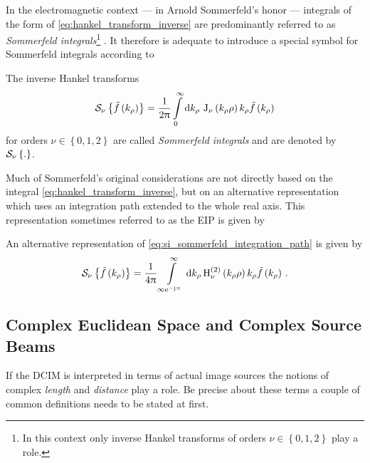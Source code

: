 In the electromagnetic context --- in Arnold Sommerfeld's honor --- integrals of
the form of \eqref{eq:hankel_transform_inverse} are predominantly referred to
as \emph{Sommerfeld integrals}\footnote{In this context only inverse Hankel
transforms of orders $\nu \in \left\{0, 1, 2\right\}$ play a role.}
\cite{Sommerfeld1909, Mosig2021}.
It therefore is adequate to introduce a special symbol for Sommerfeld integrals
according to
\begin{definition}	
	The inverse Hankel transforms
	\begin{equation}\label{eq:si_sommerfeld_integration_path}
		\mathcal{S}_{\nu} \left\{\tilde{f} \left( k_\rho \right)\right\} =
		\frac{1}{2\uppi}
		\int\limits_{0}^{\infty} \mathrm{d} k_\rho \,
		\operatorname{J}_{\nu}\left(k_\rho \rho\right) k_\rho
		\tilde{f} \left(k_\rho\right) 
	\end{equation}
	for orders $\nu \in \left\{0, 1, 2\right\}$ are called \emph{Sommerfeld
	integrals} and are denoted by $\mathcal{S}_{\nu} \left\{.\right\}$.
\end{definition}

Much of Sommerfeld's original considerations \cite{Sommerfeld1909} are not
directly based on the integral \eqref{eq:hankel_transform_inverse}, but
on an alternative representation which uses an integration path extended to
the whole real axis. This representation sometimes referred to as the \ac{EIP}
is given by
\begin{corollary}
	An alternative representation of \eqref{eq:si_sommerfeld_integration_path}
	is given by
	\begin{equation}\label{eq:si_extended_integration_path}
		\mathcal{S}_{\nu} \left\{\tilde{f} \left( k_\rho \right)\right\} =
		\frac{1}{4\uppi}
		\int\limits_{\infty \mathrm{e}^{-\mathrm{j} \uppi}\,}^{\infty} \mathrm{d} k_\rho 
		\operatorname{H}_{\nu}^{\left( 2 \right)} \left(k_\rho \rho\right) k_\rho 
		\tilde{f} \left(k_\rho\right) \, .
	\end{equation}
\end{corollary}





\subsection{Complex Euclidean Space and Complex Source Beams}

If the \ac{DCIM} is interpreted in terms of actual image sources the notions
of complex \emph{length} and \emph{distance} play a role.
Be precise about these terms a couple of common definitions
\cite{pohl2020, heuser2006}
needs to be stated at first.

